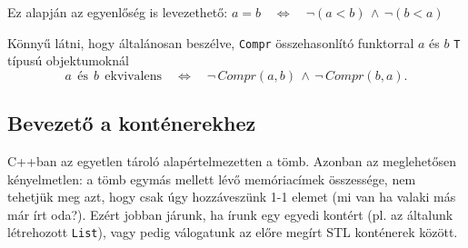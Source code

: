 \documentclass[a4paper,11.5pt]{article}
\begin{document}
	Ez alapján az egyenlőség is levezethető: \quad $a = b \quad \Leftrightarrow \quad \neg(a<b)\, \wedge\, \neg(b<a)$
	\medskip
	
	Könnyű látni, hogy általánosan beszélve, \texttt{Compr} összehasonlító funktorral $a$ és $b$ \texttt{T} típusú objektumoknál
	\[ a\ \ \text{és}\ \ b\ \ \text{ekvivalens}\quad \Leftrightarrow\quad \neg \,Compr(a, b)\, \wedge\, \neg \,Compr(b, a). \]

	\subsection{Bevezető a konténerekhez}
	C++ban az egyetlen tároló alapértelmezetten a tömb. Azonban az meglehetősen kényelmetlen: a tömb egymás mellett lévő memóriacímek összessége, nem tehetjük meg azt, hogy csak úgy hozzáveszünk 1-1 elemet (mi van ha valaki más már írt oda?). Ezért jobban járunk, ha írunk egy egyedi kontért (pl. az általunk létrehozott \texttt{List}), vagy pedig válogatunk az előre megírt STL konténerek között.
	
\end{document}
